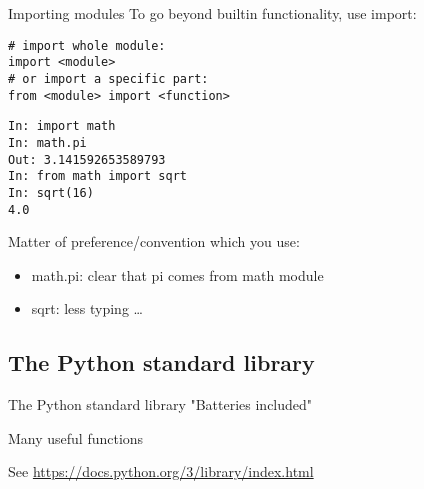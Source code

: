 \documentclass[aspectratio=169,usenames,dvipsnames]{beamer}
\begin{document}
\begin{frame}[fragile]{Importing modules}
To go beyond builtin functionality, use import:
\begin{lstlisting}
# import whole module:
import <module>
# or import a specific part:
from <module> import <function>
\end{lstlisting}

\pause
\begin{lstlisting}
In: import math
In: math.pi
Out: 3.141592653589793
In: from math import sqrt
In: sqrt(16)
4.0
\end{lstlisting}

Matter of preference/convention which you use:
\begin{itemize}
	\item math.pi: clear that pi comes from math module
	\item sqrt: less typing \dots
\end{itemize}
\end{frame}

\subsection{The Python standard library}
\begin{frame}[fragile]{The Python standard library}
	"Batteries included"

	\vspace{1em}
	Many useful functions

	\vspace{1em}
    See \url{https://docs.python.org/3/library/index.html}
\end{frame}
\end{document}
